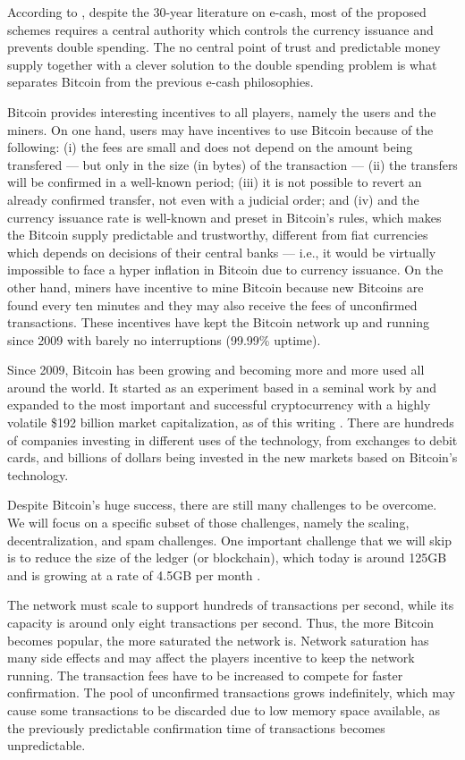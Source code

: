 According to \citet{barber2012bitter}, despite the 30-year literature on e-cash, most of the proposed schemes requires a central authority which controls the currency issuance and prevents double spending. The no central point of trust and predictable money supply together with a clever solution to the double spending problem is what separates Bitcoin from the previous e-cash philosophies. %

Bitcoin provides interesting incentives to all players, namely the users and the miners. On one hand, users may have incentives to use Bitcoin because of the following: (i) the fees are small and does not depend on the amount being transfered --- but only in the size (in bytes) of the transaction --- (ii) the transfers will be confirmed in a well-known period; (iii) it is not possible to revert an already confirmed transfer, not even with a judicial order; and (iv) and the currency issuance rate is well-known and preset in Bitcoin's rules, which makes the Bitcoin supply predictable and trustworthy, different from fiat currencies which depends on decisions of their central banks --- i.e., it would be virtually impossible to face a hyper inflation in Bitcoin due to currency issuance. On the other hand, miners have incentive to mine Bitcoin because new Bitcoins are found every ten minutes and they may also receive the fees of unconfirmed transactions. These incentives have kept the Bitcoin network up and running since 2009 with barely no interruptions (99.99\% uptime).

Since 2009, Bitcoin has been growing and becoming more and more used all around the world. It started as an experiment based in a seminal work by \citet{nakamoto2008bitcoin} and expanded to the most important and successful cryptocurrency with a highly volatile \$192 billion market capitalization, as of this writing \citep{coinmarketcapbtc}. There are hundreds of companies investing in different uses of the technology, from exchanges to debit cards, and billions of dollars being invested in the new markets based on Bitcoin's technology.

Despite Bitcoin's huge success, there are still many challenges to be overcome. We will focus on a specific subset of those challenges, namely the scaling, decentralization, and spam challenges. One important challenge that we will skip is to reduce the size of the ledger (or blockchain), which today is around 125GB and is growing at a rate of 4.5GB per month \citep{blockchaininfosize}.

The network must scale to support hundreds of transactions per second, while its capacity is around only eight transactions per second. Thus, the more Bitcoin becomes popular, the more saturated the network is. Network saturation has many side effects and may affect the players incentive to keep the network running. The transaction fees have to be increased to compete for faster confirmation. The pool of unconfirmed transactions grows indefinitely, which may cause some transactions to be discarded due to low memory space available, as the previously predictable confirmation time of transactions becomes unpredictable.

